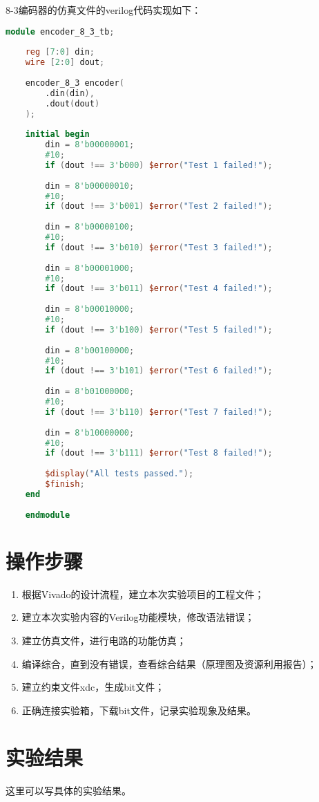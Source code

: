 \documentclass{experiment}
\begin{document}
8-3编码器的仿真文件的verilog代码实现如下：
\begin{lstlisting}[language=verilog]
	module encoder_8_3_tb;
	
	reg [7:0] din;
	wire [2:0] dout;
	
	encoder_8_3 encoder(
		.din(din),
		.dout(dout)
	);
	
	initial begin
		din = 8'b00000001;
		#10;
		if (dout !== 3'b000) $error("Test 1 failed!");
		
		din = 8'b00000010;
		#10;
		if (dout !== 3'b001) $error("Test 2 failed!");
		
		din = 8'b00000100;
		#10;
		if (dout !== 3'b010) $error("Test 3 failed!");
		
		din = 8'b00001000;
		#10;
		if (dout !== 3'b011) $error("Test 4 failed!");
		
		din = 8'b00010000;
		#10;
		if (dout !== 3'b100) $error("Test 5 failed!");
		
		din = 8'b00100000;
		#10;
		if (dout !== 3'b101) $error("Test 6 failed!");
		
		din = 8'b01000000;
		#10;
		if (dout !== 3'b110) $error("Test 7 failed!");
		
		din = 8'b10000000;
		#10;
		if (dout !== 3'b111) $error("Test 8 failed!");
		
		$display("All tests passed.");
		$finish;
	end
	
	endmodule
\end{lstlisting}

\section{操作步骤}

\begin{enumerate}
\item 根据Vivado的设计流程，建立本次实验项目的工程文件；
\item 建立本次实验内容的Verilog功能模块，修改语法错误；
\item 建立仿真文件，进行电路的功能仿真；
\item 编译综合，直到没有错误，查看综合结果（原理图及资源利用报告）；
\item 建立约束文件xdc，生成bit文件；
\item 正确连接实验箱，下载bit文件，记录实验现象及结果。
\end{enumerate}

\section{实验结果}

这里可以写具体的实验结果。


\nocite{*}

\end{document}
